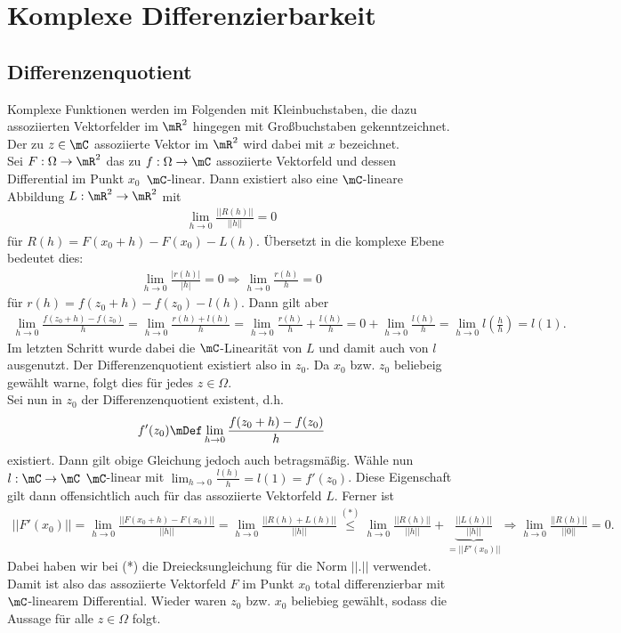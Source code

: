 \section{Komplexe Differenzierbarkeit}
\subsection{Differenzenquotient}
Komplexe Funktionen werden im Folgenden mit Kleinbuchstaben, die dazu assoziierten Vektorfelder im $\mR^{2}$ hingegen mit Großbuchstaben gekenntzeichnet. Der zu $z\in\mC$ assoziierte Vektor im $\mR^{2}$ wird dabei mit $x$ bezeichnet.\\
Sei $F:\Omega\rightarrow \mR^{2}$ das zu $f:\Omega\rightarrow\mC$ assoziierte Vektorfeld und dessen Differential im Punkt $x_{0}$\ $\mC$-linear. Dann existiert also eine $\mC$-lineare Abbildung $L:\mR^{2}\rightarrow\mR^{2}$ mit
\begin{align*}
    \lim_{h\to0}\frac{||R(h)||}{||h||}=0
\end{align*}
für $R(h)=F(x_{0}+h)-F(x_{0})-L(h)$. Übersetzt in die komplexe Ebene bedeutet dies:
\begin{align*}
    \lim_{h\to0}\frac{|r(h)|}{|h|}=0 \Rightarrow \lim_{h\to0}\frac{r(h)}{h}=0
\end{align*}
für $r(h)=f(z_{0}+h)-f(z_{0})-l(h)$. Dann gilt aber
\begin{align*}
    \lim_{h\to0}\frac{f(z_{0}+h)-f(z_{0})}{h}= \lim_{h\to0}\frac{r(h)+l(h)}{h}=\lim_{h\to0}\frac{r(h)}{h}+\frac{l(h)}{h}=0+\lim_{h\to0}\frac{l(h)}{h}=\lim_{h\to0}l\left(\frac{h}{h}\right)=l(1).
\end{align*}
Im letzten Schritt wurde dabei die $\mC$-Linearität von $L$ und damit auch von $l$ ausgenutzt. Der Differenzenquotient existiert also in $z_{0}$. Da $x_{0}$ bzw. $z_{0}$ beliebeig gewählt warne, folgt dies für jedes $z\in\Omega$.\\[8pt]
Sei nun in $z_{0}$ der Differenzenquotient existent, d.h.
\begin{align*}
    f'(z_{0})\mDef\lim_{h\to0}\frac{f(z_{0}+h)-f(z_{0})}{h}
\end{align*}
existiert. Dann gilt obige Gleichung jedoch auch betragsmäßig. Wähle nun $l:\mC\rightarrow\mC$ $\mC$-linear mit $\lim_{h\to0}\frac{l(h)}{h}=l(1)=f'(z_{0})$. Diese Eigenschaft gilt dann offensichtlich auch für das assoziierte Vektorfeld $L$. Ferner ist
\begin{align*}
    ||F'(x_{0})||=\lim_{h\to0}\frac{||F(x_{0}+h)-F(x_{0})||}{||h||}=\lim_{h\to0}\frac{||R(h)+L(h)||}{||h||}\overset{(*)}{\leq}\lim_{h\to0}\frac{||R(h)||}{||h||}+\underbrace{\frac{||L(h)||}{||h||}}_{=||F'(x_{0})||} \Rightarrow \lim_{h\to0}\frac{||R(h)||}{||0||}=0.
\end{align*}
Dabei haben wir bei (*) die Dreiecksungleichung für die Norm $||.||$ verwendet. Damit ist also das assoziierte Vektorfeld $F$ im Punkt $x_{0}$ total differenzierbar mit $\mC$-linearem Differential. Wieder waren $z_{0}$ bzw. $x_{0}$ beliebieg gewählt, sodass die Aussage für alle $z\in\Omega$ folgt.

